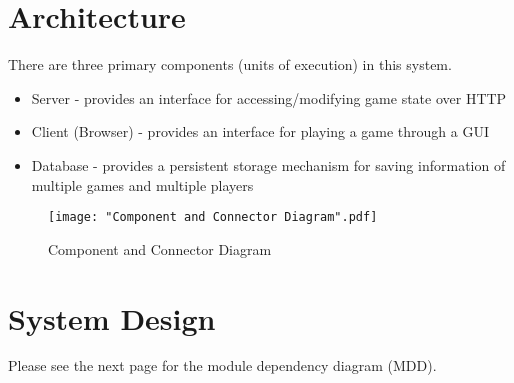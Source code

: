 \documentclass[2pt]{journal}
\begin{document}
\newpage
\section{Architecture}

There are three primary components (units of execution) in this system.
\begin{itemize}
    \item Server - provides an interface for accessing/modifying game state over HTTP
    \item Client (Browser) - provides an interface for playing a game through a GUI
    \item Database - provides a persistent storage mechanism for saving information of multiple games and multiple players
\end{itemize}

\begin{figure}[h]
\center
\texttt{[image: "Component and Connector Diagram".pdf]}
\caption{Component and Connector Diagram}
\end{figure}

\newpage
\section{System Design}

Please see the next page for the module dependency diagram (MDD). \\
\end{document}
